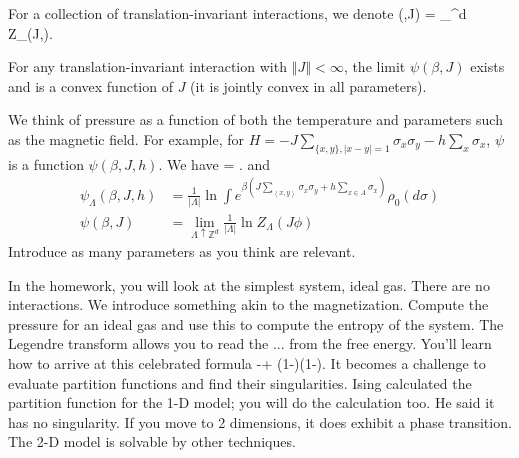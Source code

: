 For a collection of translation-invariant interactions, we denote 
\be
\psi(\beta,J) = \lim_{\lambda \uparrow {}^d}  \ln Z_{\Lambda}(J,\phi).
\ee
\begin{theorem}\label{thm:j-limit}
For any translation-invariant interaction with $\left\Vert {J}\right\Vert<\infty$, %
the limit 
$
\psi(\beta, J) 
$
exists and is a convex function of $J$ (it is jointly convex in all parameters). 
\end{theorem}
We think of pressure as a function of both the temperature and parameters such as the magnetic field.
For example, for $H=-J\sum_{\{x,y\},|x-y|=1} \sigma_x\sigma_y - h\sum_x \sigma_x$, %
$\psi$ is a function $\psi(\beta, J,h)$. We have
\be
{} = \beta\left{}\right\rangle.
\ee
and
\begin{align*}
\psi_{\Lambda}(\beta, J, h) &= \frac{1}{|\Lambda|} \ln \int e^{\beta(J\sum_{\left\langle {x,y}\right\rangle} \sigma_x\sigma_y+ h\sum_{x\in A} \sigma_x)}\rho_0(d\sigma)\\
\psi(\beta,J) &= \lim_{\Lambda\uparrow \mathbb{Z}^d} \frac{1}{|\Lambda|}\ln Z_{\Lambda}(J\phi)
\end{align*}
Introduce as many parameters as you think are relevant.

In the homework, you will look at the simplest system, ideal gas. There are no interactions. We introduce something akin to the magnetization. Compute the pressure for an ideal gas and use this to compute the entropy of the system. The Legendre transform allows you to read the ... from the free energy. You'll learn how to arrive at this celebrated formula 
\be
-\rho\ln \rho + (1-\rho)\ln (1-\rho).
\ee
It becomes a challenge to evaluate partition functions and find their singularities. Ising calculated the partition function for the 1-D model; you will do the calculation too. He said it has no singularity. If you move to 2 dimensions, it does exhibit a phase transition. %
The 2-D model is solvable by other techniques.